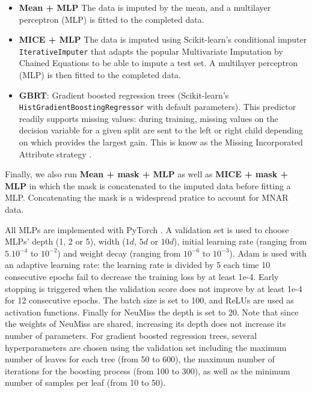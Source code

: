 \documentclass{article}
\theoremstyle{plain}
\begin{document}
\begin{itemize}[itemsep=0ex, topsep=0ex, partopsep=0.5ex, parsep=0.5ex, leftmargin=2.5ex]
    \item \textbf{Mean + MLP} The data is imputed by the mean, and a multilayer perceptron (MLP) is fitted to the completed data.
    \item \textbf{MICE + MLP} The data is imputed using Scikit-learn's \citep[BSD licensed]{Pedregosa2011Scikit} conditional imputer \texttt{IterativeImputer} that adapts the popular Multivariate Imputation by Chained Equations  \citep[MICE,][]{VanBuuren2018Flexible} to be able to impute a test set. A multilayer perceptron (MLP) is then fitted to the completed data.

    \item \textbf{GBRT}: Gradient boosted regression trees  (Scikit-learn's \texttt{HistGradientBoostingRegressor} with default parameters). This predictor readily supports missing values: during training, missing values on the decision variable for a given split are sent to the left or right child depending on which provides the largest gain. This is know as the Missing Incorporated Attribute strategy \citep{Twala2008_mia}.
\end{itemize}
Finally, we also run \textbf{Mean + mask + MLP} as well as \textbf{MICE + mask + MLP} in which the mask is concatenated to the imputed data before fitting a MLP. Concatenating the mask is a widespread pratice to account for MNAR data.


All MLPs are implemented with PyTorch \citep{paszke2019pytorch}. A validation set is used to choose MLPs' depth (1, 2 or 5), width ($1d$, $5d$ or $10d$), initial learning rate (ranging from $5.10^{-4}$ to $10^{-2}$) and weight decay (ranging from $10^{-6}$ to $10^{-3}$). Adam is used with an adaptive learning rate: the learning rate is divided by 5 each time 10 consecutive epochs fail to decrease the training loss by at least 1e-4. Early stopping is triggered when the validation score does not improve by at least 1e-4 for 12 consecutive epochs. The batch size is set to 100, and ReLUs are used as activation functions. Finally for NeuMiss the depth is set to 20. Note that since the weights of NeuMiss are shared, increasing its depth does not increase its number of parameters. %
For gradient boosted regression trees, several hyperparameters are chosen using the validation set including the maximum number of leaves for each tree (from 50 to 600), the maximum number of iterations for the boosting process (from 100 to 300), as well as the minimum number of samples per leaf (from 10 to 50). 
\end{document}
